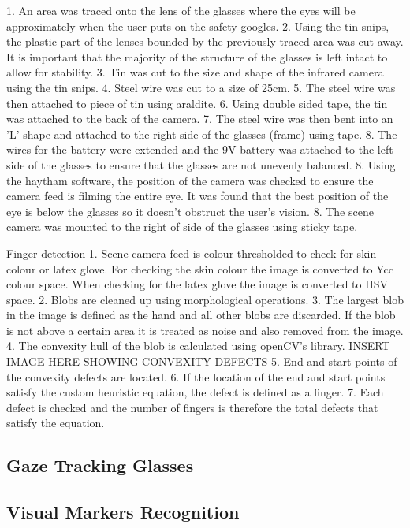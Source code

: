 \documentclass[jou,a4paper,notxfonts]{apa}
\begin{document}
1. An area was traced onto the lens of the glasses where the eyes will be approximately when the user puts on the safety googles. 
2. Using the tin snips, the plastic part of the lenses bounded by the previously traced area was cut away. It is important that the
majority of the structure of the glasses is left intact to allow for stability.
3. Tin was cut to the size and shape of the infrared camera using the tin snips.
4. Steel wire was cut to a size of 25cm.
5. The steel wire was then attached to piece of tin using araldite.
6. Using double sided tape, the tin was attached to the back of the camera.
7. The steel wire was then bent into an 'L' shape and attached to the right side of the glasses (frame) using tape.
8. The wires for the battery were extended and the 9V battery was attached to the left side of the glasses to ensure that the glasses
are not unevenly balanced.
8. Using the haytham software, the position of the camera was checked to ensure the camera feed is filming the entire eye.
It was found that the best position of the eye is below the glasses so it doesn't obstruct the user's vision. 
8. The scene camera was mounted to the right of side of the glasses using sticky tape.

Finger detection
1. Scene camera feed is colour thresholded to check for skin colour or latex glove. For checking the skin colour the image is 
converted to Ycc colour space. When checking for the latex glove the image is converted to HSV space.
2. Blobs are cleaned up using morphological operations.
3. The largest blob in the image is defined as the hand and all other blobs are discarded. If the blob is not above a certain area
it is treated as noise and also removed from the image.
4. The convexity hull of the blob is calculated using openCV's library.
INSERT IMAGE HERE SHOWING CONVEXITY DEFECTS
5. End and start points of the convexity defects are located.
6. If the location of the end and start points satisfy the custom heuristic equation, the defect is defined as a finger.
7. Each defect is checked and the number of fingers is therefore the total defects that satisfy the equation.

\subsection{Gaze Tracking Glasses}

\subsection{Visual Markers Recognition}
\end{document}
